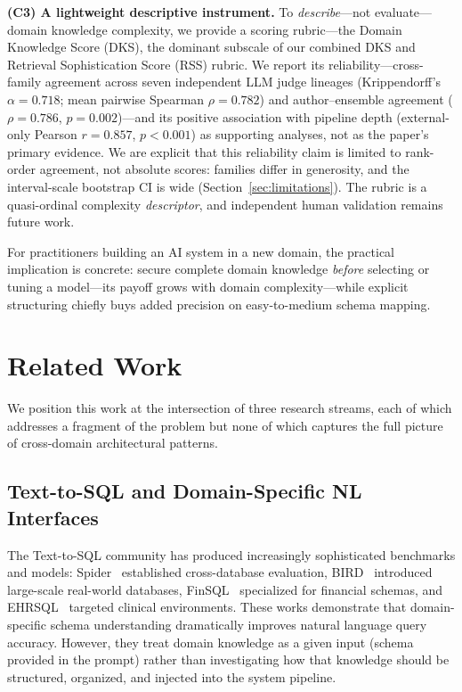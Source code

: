 \documentclass[fleqn,10pt,lineno]{wlpeerj}
\begin{document}
\noindent\textbf{(C3) A lightweight descriptive instrument.} To \textit{describe}---not evaluate---domain knowledge complexity, we provide a scoring rubric---the Domain Knowledge Score (DKS), the dominant subscale of our combined DKS and Retrieval Sophistication Score (RSS) rubric. We report its reliability---cross-family agreement across seven independent LLM judge lineages (Krippendorff's $\alpha = 0.718$; mean pairwise Spearman $\rho = 0.782$) and author--ensemble agreement ($\rho = 0.786$, $p = 0.002$)---and its positive association with pipeline depth (external-only Pearson $r = 0.857$, $p < 0.001$) as supporting analyses, not as the paper's primary evidence. We are explicit that this reliability claim is limited to rank-order agreement, not absolute scores: families differ in generosity, and the interval-scale bootstrap CI is wide (Section~\ref{sec:limitations}). The rubric is a quasi-ordinal complexity \textit{descriptor}, and independent human validation remains future work.

For practitioners building an AI system in a new domain, the practical implication is concrete: secure complete domain knowledge \textit{before} selecting or tuning a model---its payoff grows with domain complexity---while explicit structuring chiefly buys added precision on easy-to-medium schema mapping.


\section{Related Work}
\label{sec:related}

We position this work at the intersection of three research streams, each of which addresses a fragment of the problem but none of which captures the full picture of cross-domain architectural patterns.

\subsection{Text-to-SQL and Domain-Specific NL Interfaces}

The Text-to-SQL community has produced increasingly sophisticated benchmarks and models: Spider~\citep{spider} established cross-database evaluation, BIRD~\citep{bird} introduced large-scale real-world databases, FinSQL~\citep{finsql} specialized for financial schemas, and EHRSQL~\citep{ehrsql} targeted clinical environments. These works demonstrate that domain-specific schema understanding dramatically improves natural language query accuracy. However, they treat domain knowledge as a given input (schema provided in the prompt) rather than investigating how that knowledge should be structured, organized, and injected into the system pipeline.
\end{document}
